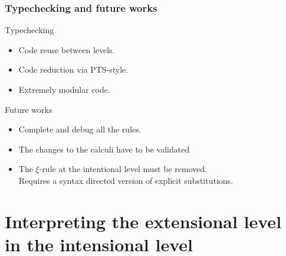 \documentclass{beamer}
\begin{document}
\begin{frame}{}\frametitle{Typechecking and future works}

\begin{block}{Typechecking}
\begin{itemize}
	\item Code reuse between levels.
	\item Code reduction via PTS-style.
	\item Extremely modular code.
\end{itemize}
\end{block}
\begin{block}{Future works}
\begin{itemize}
        \item Complete and debug all the rules.
	\item The changes to the calculi have to be validated
	\item The $\xi$-rule at the intentional level must be removed.\\
          Requires a syntax directed version of explicit substitutions.
\end{itemize}
\end{block}
\end{frame}

\section{Interpreting the extensional level in the intensional level}
\end{document}
